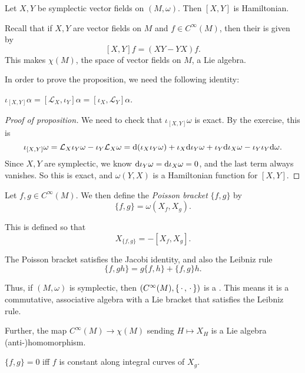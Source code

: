 \documentclass[a4paper]{article}
\begin{document}
\begin{prop}
  Let $X, Y$ be symplectic vector fields on $(M, \omega)$. Then $[X, Y]$ is Hamiltonian.
\end{prop}
Recall that if $X, Y$ are vector fields on $M$ and $f \in C^\infty(M)$, then their  is given by
\[
  [X, Y]f = (XY - YX)f.
\]
This makes $\chi(M)$, the space of vector fields on $M$, a Lie algebra.

In order to prove the proposition, we need the following identity:
\begin{ex}
  $\iota_{[X, Y]}\alpha = [\mathcal{L}_X, \iota_Y] \alpha = [\iota_X, \mathcal{L}_Y] \alpha$.
\end{ex}

\begin{proof}[Proof of proposition]
  We need to check that $\iota_{[X, Y]} \omega$ is exact. By the exercise, this is
  \[
    \iota_{[X, Y]}\omega = \mathcal{L}_X \iota_Y \omega - \iota_Y \mathcal{L}_X \omega = \mathrm{d} (\iota_X \iota_Y \omega) + \iota_X \mathrm{d} \iota_Y \omega + \iota_Y \mathrm{d} \iota_X \omega - \iota_Y \iota_Y \mathrm{d} \omega.
  \]
  Since $X, Y$ are symplectic, we know $\mathrm{d} \iota_Y \omega = \mathrm{d} \iota_X \omega = 0$, and the last term always vanishes. So this is exact, and $\omega(Y, X)$ is a Hamiltonian function for $[X, Y]$.
\end{proof}

\begin{defi}
  Let $f, g \in C^\infty(M)$. We then define the \emph{Poisson bracket} $\{f, g\}$ by
  \[
    \{f, g\} = \omega(X_f, X_g).
  \]
\end{defi}
This is defined so that
\[
  X_{\{f, g\}} = -[X_f, X_g].
\]
\begin{ex}
  The Poisson bracket satisfies the Jacobi identity, and also the Leibniz rule
  \[
    \{f, gh\} = g\{f, h\} + \{f, g\}h.
  \]
\end{ex}
Thus, if $(M, \omega)$ is symplectic, then $(C^\infty(M), \{\,\cdot\,, \,\cdot\,\})$ is a . This means it is a commutative, associative algebra with a Lie bracket that satisfies the Leibniz rule.

Further, the map $C^\infty(M) \to \chi(M)$ sending $H \mapsto X_H$ is a Lie algebra (anti-)homomorphism.

\begin{prop}
  $\{f, g\} = 0$ iff $f$ is constant along integral curves of $X_g$.
\end{prop}
\end{document}
